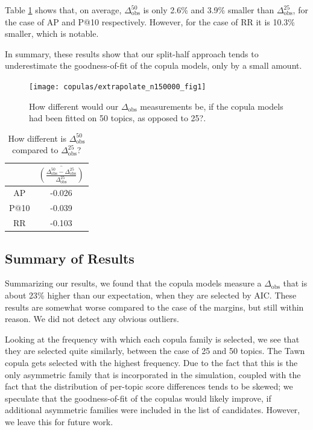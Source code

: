 Table \ref{tab:copulas-extrapolate-table-1} shows that, on average, $\Delta_\text{obs}^{50}$ is only 2.6\% and 3.9\% smaller than $\Delta_\text{obs}^{25}$, for the case of AP and P@10 respectively. However, for the case of RR it is 10.3\% smaller, which is notable. 

In summary, these results show that our split-half approach tends to underestimate the goodness-of-fit of the copula models, only by a small amount. 

\begin{figure}[t]
	\centering	
	\texttt{[image: copulas/extrapolate\_n150000\_fig1]}
	\caption{How different would our $\Delta_\text{obs}$ measurements be, if the copula models had been fitted on 50 topics, as opposed to 25?.}
	\label{fig:copulas-extrapolate-plot-1}
\end{figure}

\begin{table}[!t]
	\centering
	\begin{tabular}{c c}
		\toprule
		& $\overline{\left(\frac{\Delta_\text{obs}^{50} - \Delta_\text{obs}^{25}}{\Delta_\text{obs}^{25}}\right)}$ \\ \midrule
		AP    & -0.026       \\
		P@10  & -0.039       \\
		RR    & -0.103      \\ \bottomrule
	\end{tabular}
	\caption{How different is $\Delta_\text{obs}^{50}$ compared to $\Delta_\text{obs}^{25}$?}
	\label{tab:copulas-extrapolate-table-1}
\end{table}

\subsection{Summary of Results}

Summarizing our results, we found that the copula models measure a $\Delta_{\text{obs}}$ that is about 23\% higher than our expectation, when they are selected by AIC. These results are somewhat worse compared to the case of the margins, but still within reason. We did not detect any obvious outliers.
 
Looking at the frequency with which each copula family is selected, we see that they are selected quite similarly, between the case of 25 and 50 topics.  
The Tawn copula gets selected with the highest frequency. Due to the fact that this is the only asymmetric family that is incorporated in the simulation, coupled with the fact that the distribution of per-topic score differences tends to be skewed; we speculate that the goodness-of-fit of the copulas would likely improve, if additional asymmetric families were included in the list of candidates. However, we leave this for future work.

